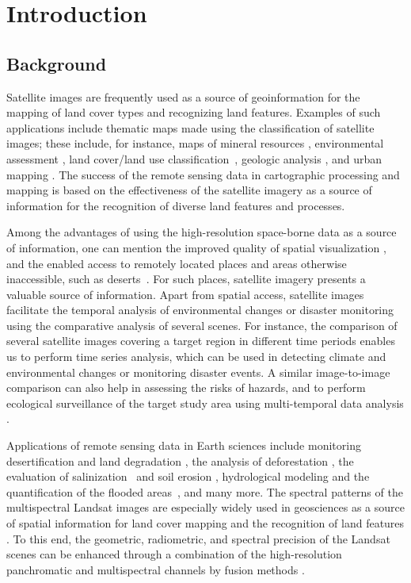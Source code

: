 \documentclass[information,article,accept,pdftex,moreauthors]{Definitions/mdpi}
\begin{document}
\section{Introduction}

\subsection{{Background}}
Satellite images are frequently used as a source of geoinformation for the mapping of land cover types and recognizing land features. Examples of such applications include thematic maps made using the classification of satellite images; these include, for instance, maps of mineral resources \cite{ABDELKAREEM2018682,1294518,rs11121450}, environmental assessment \cite{615837,Lemenkova202227}, land cover/land use classification~\cite{516791,Lemenkova202229}, geologic analysis \cite{6723607,KAMEL2022104420}, and urban mapping \cite{MOHAMED2019103507}. The success of the remote sensing data in cartographic processing and mapping is based on the effectiveness of the satellite imagery as a source of information for the recognition of diverse land features and processes. 

Among the advantages of {using }the high-resolution {space-borne }data as a source of information{, }one can mention the improved quality of spatial visualization \cite{ABDALLA20128,Lemenkova202230}, and the enabled access to remotely located places and areas otherwise inaccessible, such as deserts~\cite{6350376}. For such places, satellite {imagery }presents a valuable source of information. Apart from spatial access, satellite images {facilitate }the temporal analysis of environmental changes or disaster monitoring using {the } comparative analysis of several scenes. For instance, the comparison of several satellite images covering a target region in different time periods enables us to perform time series analysis, which can be used in detecting climate and environmental changes {or }monitoring disaster events{. A similar image-to-image comparison can also help in assessing} the risks of hazards, and to perform ecological surveillance of the target study area using multi-temporal data analysis \cite{9171725,SINGH2020423,Hashim}. 

Applications of remote sensing data in Earth sciences include monitoring desertification and land degradation \cite{Badreldin,Kawy}, the analysis of deforestation \cite{516791}, the evaluation of salinization~\cite{8949893} and soil erosion \cite{Gad2020}, hydrological modeling and the quantification of the flooded areas~\cite{TAHA2017157,ELSADEK2019377}, and many more. The spectral patterns of the multispectral Landsat images are especially widely used in geosciences as a source of spatial information for land cover mapping and the recognition of land features \cite{8486245}. To this end, the geometric, radiometric, and spectral precision of the Landsat scenes can be enhanced through a combination of the high-resolution panchromatic and multispectral channels by fusion methods \cite{4420687}.
\end{document}
